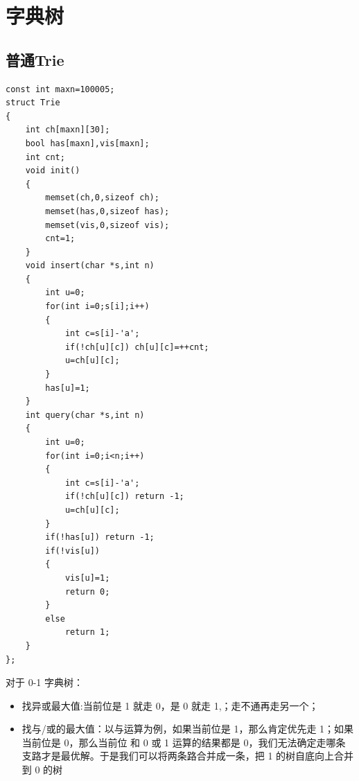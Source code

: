 \section{字典树}

\subsection{普通Trie}
\begin{verbatim}
const int maxn=100005;
struct Trie
{
    int ch[maxn][30];
    bool has[maxn],vis[maxn];
    int cnt;
    void init()
    {
        memset(ch,0,sizeof ch);
        memset(has,0,sizeof has);
        memset(vis,0,sizeof vis);
        cnt=1;
    }
    void insert(char *s,int n)
    {
        int u=0;
        for(int i=0;s[i];i++)
        {
            int c=s[i]-'a';
            if(!ch[u][c]) ch[u][c]=++cnt;
            u=ch[u][c];
        }
        has[u]=1;
    }
    int query(char *s,int n)
    {
        int u=0;
        for(int i=0;i<n;i++)
        {
            int c=s[i]-'a';
            if(!ch[u][c]) return -1;
            u=ch[u][c];
        }
        if(!has[u]) return -1;
        if(!vis[u])
        {
            vis[u]=1;
            return 0;
        }
        else
            return 1;
    }
};
\end{verbatim}
对于 0-1 字典树：
\begin{itemize}
\item 找异或最大值:当前位是 1 就走 0，是 0 就走 1,；走不通再走另一个；
\item 找与/或的最大值：以与运算为例，如果当前位是 1，那么肯定优先走 1；如果当前位是 0，那么当前位 和 0 或 1 运算的结果都是 0，我们无法确定走哪条支路才是最优解。于是我们可以将两条路合并成一条，把 1 的树自底向上合并到 0 的树
\end{itemize}

